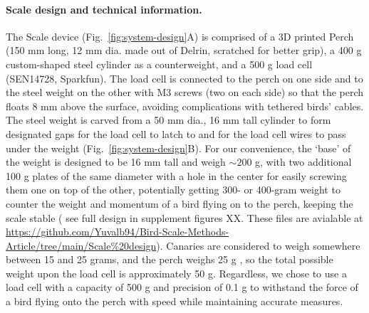 \documentclass{article}
\begin{document}
\paragraph{Scale design and technical information.}
The Scale device (Fig.~\ref{fig:system-design}A) is comprised of a 3D printed Perch (150 mm long, 12 mm dia. made out of Delrin, scratched for better grip), a 400 g custom-shaped steel cylinder as a counterweight, and a 500 g load cell (SEN14728, Sparkfun). The load cell is connected to the perch on one side and to the steel weight on the other with M3 screws (two on each side) so that the perch floats 8 mm above the surface, avoiding complications with tethered birds' cables. The steel weight is carved from a 50 mm dia., 16 mm tall cylinder to form designated gaps for the load cell to latch to and for the load cell wires to pass under the weight (Fig.~\ref{fig:system-design}B). For our convenience, the ‘base’ of the weight is designed to be 16 mm tall and weigh $ \sim 200 $ g, with two additional 100 g plates of the same diameter with a hole in the center for easily screwing them one on top of the other, potentially getting 300- or 400-gram weight to counter the weight and momentum of a bird flying on to the perch, keeping the scale stable ({\color{red} see full design in supplement figures XX. These files are avialable at \url{https://github.com/Yuvalb94/Bird-Scale-Methods-Article/tree/main/Scale%20design}}). Canaries are considered to weigh somewhere between 15 and 25 grams\cite{dorrestein2009passerines}, and the perch weighs 25 g , so the total possible weight upon the load cell is approximately 50 g. Regardless, we chose to use a load cell with a capacity of 500 g and precision of 0.1 g to withstand the force of a bird flying onto the perch with speed while maintaining accurate measures. 
\end{document}
